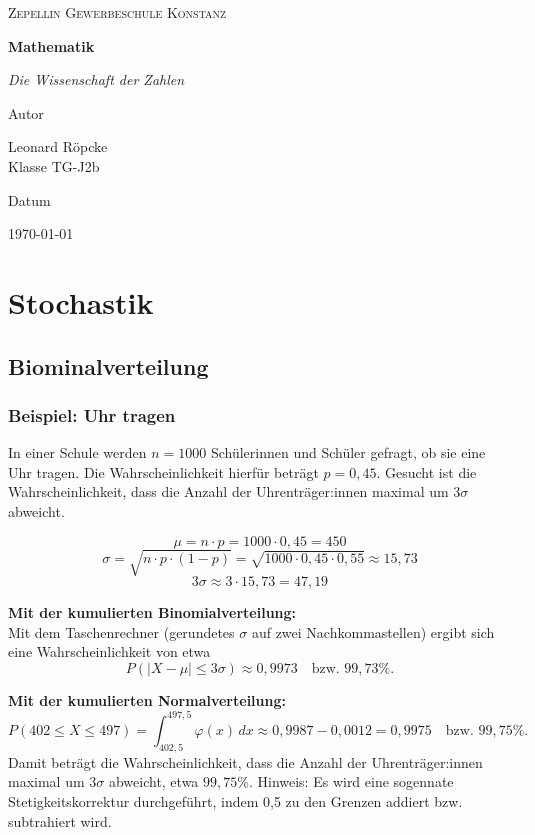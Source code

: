 \documentclass{article}
\newcommand{\AuthorName}{Leonard Röpcke\\Klasse TG-J2b}
\newcommand{\Institute}{Zepellin Gewerbeschule Konstanz}
\newcommand{\Subtitle}{Die Wissenschaft der Zahlen}
\newcommand{\MyDate}{\today}
\begin{document}
\begin{titlepage}
  \centering
  {\scshape\LARGE \Institute \par}
  \vspace{2.5cm}
  {\huge\bfseries Mathematik\par}
  \vspace{0.8cm}
  {\Large\itshape \Subtitle \par}
  \vfill
  {\Large Autor\par}
  {\Large \AuthorName \par}
  \vspace{1cm}
  {\Large Datum\par}
  {\Large \MyDate \par}
  \vfill
  \vspace{1cm}
  {\small }
\end{titlepage}
\tableofcontents
\newpage

\section{Stochastik}
\subsection{Biominalverteilung}
\subsubsection{Beispiel: Uhr tragen}
In einer Schule werden \( n = 1000 \) Schülerinnen und Schüler gefragt, ob sie eine Uhr tragen.  
Die Wahrscheinlichkeit hierfür beträgt \( p = 0{,}45 \).
Gesucht ist die Wahrscheinlichkeit, dass die Anzahl der Uhrenträger:innen maximal um \( 3\sigma \) abweicht.

\[
\mu = n \cdot p = 1000 \cdot 0{,}45 = 450
\]
\[
\sigma = \sqrt{n \cdot p \cdot (1 - p)} = \sqrt{1000 \cdot 0{,}45 \cdot 0{,}55} \approx 15{,}73
\]
\[
3\sigma \approx 3 \cdot 15{,}73 = 47{,}19
\]

\noindent
\textbf{Mit der kumulierten Binomialverteilung:}\\
Mit dem Taschenrechner (gerundetes \(\sigma\) auf zwei Nachkommastellen) ergibt sich eine Wahrscheinlichkeit von etwa
\[
P(|X - \mu| \leq 3\sigma) \approx 0{,}9973 \quad \text{bzw. } 99{,}73\%.
\]

\medskip
\noindent
\textbf{Mit der kumulierten Normalverteilung:}
\[
P(402 \leq X \leq 497)
= \int_{402{,}5}^{497{,}5} \varphi(x) \, dx
\approx 0{,}9987 - 0{,}0012 = 0{,}9975 \quad \text{bzw. } 99{,}75\%.
\]
\noindent
Damit beträgt die Wahrscheinlichkeit, dass die Anzahl der Uhrenträger:innen maximal um \( 3\sigma \) abweicht, etwa \( 99{,}75\% \).
Hinweis: Es wird eine sogennate Stetigkeitskorrektur durchgeführt, indem 0,5 zu den Grenzen addiert bzw. subtrahiert wird.
\end{document}
